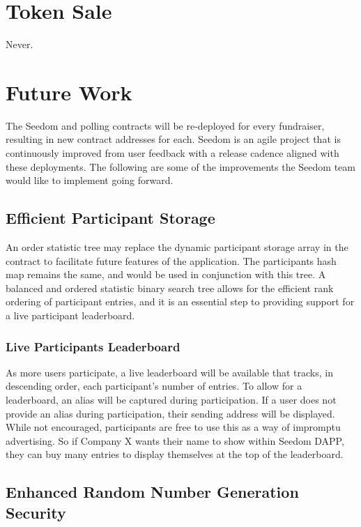 \documentclass[11pt]{article}
\begin{document}
\section{Token Sale}
Never.

\section{Future Work}

The Seedom and polling contracts will be re-deployed for every fundraiser, resulting in new contract addresses for each. Seedom is an agile project that is continuously improved from user feedback with a release cadence aligned with these deployments. The following are some of the improvements the Seedom team would like to implement going forward.

\subsection{Efficient Participant Storage}

An order statistic tree \cite{5} may replace the dynamic participant storage array in the contract to facilitate future features of the application. The participants hash map remains the same, and would be used in conjunction with this tree. A balanced and ordered statistic binary search tree allows for the efficient rank ordering of participant entries, and it is an essential step to providing support for a live participant leaderboard.

\subsubsection{Live Participants Leaderboard}

As more users participate, a live leaderboard will be available that tracks, in descending order, each participant's number of entries. To allow for a leaderboard, an alias will be captured during participation. If a user does not provide an alias during participation, their sending address will be displayed. While not encouraged, participants are free to use this as a way of impromptu advertising. So if Company X wants their name to show within Seedom DAPP, they can buy many entries to display themselves at the top of the leaderboard.

\subsection{Enhanced Random Number Generation Security}
\end{document}
